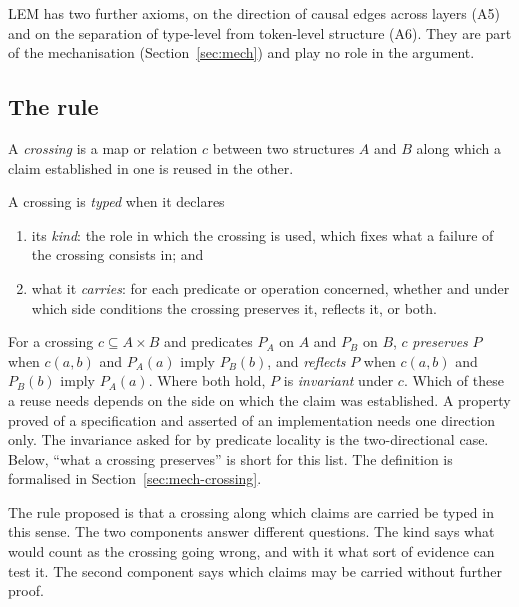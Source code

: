 \medskip
LEM has two further axioms, on the direction of causal edges across layers (A5) and on
the separation of type-level from token-level structure (A6). They are part of the
mechanisation (Section~\ref{sec:mech}) and play no role in the argument.

\subsection{The rule}
\label{sec:definition}

\begin{definition}[Crossing]
A \emph{crossing} is a map or relation $c$ between two structures $A$ and $B$ along which
a claim established in one is reused in the other.
\end{definition}

\begin{definition}
\label{def:typed}
A crossing is \emph{typed} when it declares
\begin{enumerate}[label=(\roman*)]
  \item its \emph{kind}: the role in which the crossing is used, which fixes what a
        failure of the crossing consists in; and
  \item what it \emph{carries}: for each predicate or operation concerned, whether and
        under which side conditions the crossing preserves it, reflects it, or both.
\end{enumerate}
\end{definition}

\noindent
For a crossing $c \subseteq A \times B$ and predicates $P_A$ on $A$ and $P_B$ on $B$,
$c$ \emph{preserves} $P$ when $c(a,b)$ and $P_A(a)$ imply $P_B(b)$, and \emph{reflects}
$P$ when $c(a,b)$ and $P_B(b)$ imply $P_A(a)$. Where both hold, $P$ is \emph{invariant}
under $c$. Which of these a reuse needs depends on the side on which the claim was
established. A property proved of a specification and asserted of an implementation
needs one direction only. The invariance asked for by predicate locality is the
two-directional case. Below, ``what a crossing preserves'' is short for this list. The
definition is formalised in Section~\ref{sec:mech-crossing}.

The rule proposed is that a crossing along which claims are carried be typed in this
sense. The two components answer different questions. The kind says what would count as
the crossing going wrong, and with it what sort of evidence can test it. The second
component says which claims may be carried without further proof.

